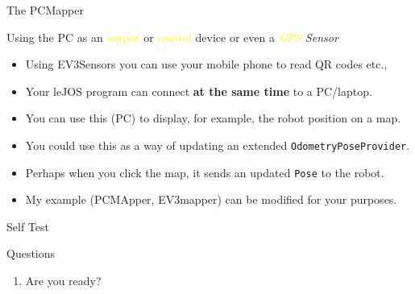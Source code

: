 \documentclass[color=pdftex,usenames,dvipsnames, aspectratio=169]{beamer}
\begin{document}
\begin{frame}{The PCMapper}
\begin{block}{Using the PC as an \textcolor{yellow}{output} or \textcolor{yellow}{control} device or even a {\emph{\textcolor{yellow}{GPS} Sensor}}}
\begin{itemize}
\item Using EV3Sensors you can use your mobile phone to read QR codes etc.,
\item Your leJOS program can connect \textbf{at the same time} to a PC/laptop.
\item You can use this (PC) to display, for example, the robot position on a map.
\item You could use this as a way of updating an extended \lstinline!OdometryPoseProvider!.
\item Perhaps when you click the map, it sends an updated \lstinline!Pose! to the robot.
\item My example (PCMApper, EV3mapper) can be modified for your purposes.
\end{itemize}
\end{block}
\end{frame}


\begin{frame}{Self Test}
\begin{block}{Questions}
\begin{enumerate}
 \item Are you ready?
\end{enumerate}

\end{block}
\end{frame}
\end{document}
